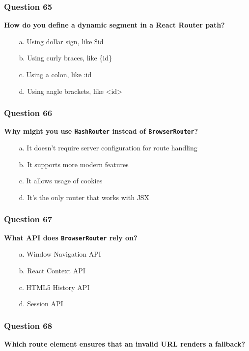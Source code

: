 \documentclass{article}
\newcommand{\cmark}{\textcolor{green}{\ding{51}}} %
\newcommand{\xmark}{\textcolor{red}{\ding{55}}}   %
\begin{document}
\subsubsection*{Question 65}
\textbf{How do you define a dynamic segment in a React Router path?}

\begin{itemize}
  \item[\xmark\ a.] Using dollar sign, like \$id
  \item[\xmark\ b.] Using curly braces, like \{id\}
  \item[\cmark\ c.] Using a colon, like :id
  \item[\xmark\ d.] Using angle brackets, like <id>
\end{itemize}

\subsubsection*{Question 66}
\textbf{Why might you use \texttt{HashRouter} instead of \texttt{BrowserRouter}?}

\begin{itemize}
  \item[\cmark\ a.] It doesn’t require server configuration for route handling
  \item[\xmark\ b.] It supports more modern features
  \item[\xmark\ c.] It allows usage of cookies
  \item[\xmark\ d.] It’s the only router that works with JSX
\end{itemize}

\subsubsection*{Question 67}
\textbf{What API does \texttt{BrowserRouter} rely on?}

\begin{itemize}
  \item[\xmark\ a.] Window Navigation API
  \item[\xmark\ b.] React Context API
  \item[\cmark\ c.] HTML5 History API
  \item[\xmark\ d.] Session API
\end{itemize}

\subsubsection*{Question 68}
\textbf{Which route element ensures that an invalid URL renders a fallback?}
\end{document}

